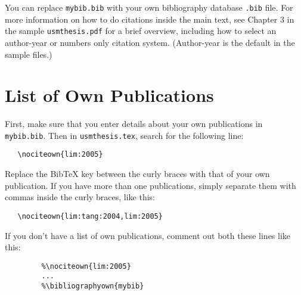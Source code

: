 You can replace \texttt{mybib.bib} with your own bibliography database \texttt{.bib} file. For more information on how to do citations inside the main text, see Chapter 3 in the sample \texttt{usmthesis.pdf} for a brief overview, including how to select an author-year or numbers only citation system. (Author-year is the default in the sample files.)



\section{List of Own Publications}

First, make sure that you enter details about your own publications in \texttt{mybib.bib}. Then in \texttt{usmthesis.tex}, search for the following line:
%
\begin{lstlisting}
   \nociteown{lim:2005}
\end{lstlisting}
%
Replace the BibTeX key between the curly braces with that of your own publication. If you have more than one publications, simply separate them with commas inside the curly braces, like this:
%
\begin{lstlisting}
   \nociteown{lim:tang:2004,lim:2005}
\end{lstlisting}
%
If you don't have a list of own publications, comment out both these lines like this:

\begin{figure}[hbt!]
\begin{lstlisting}
   %\nociteown{lim:2005} 
   ... 
   %\bibliographyown{mybib}
\end{lstlisting}
\end{figure}
